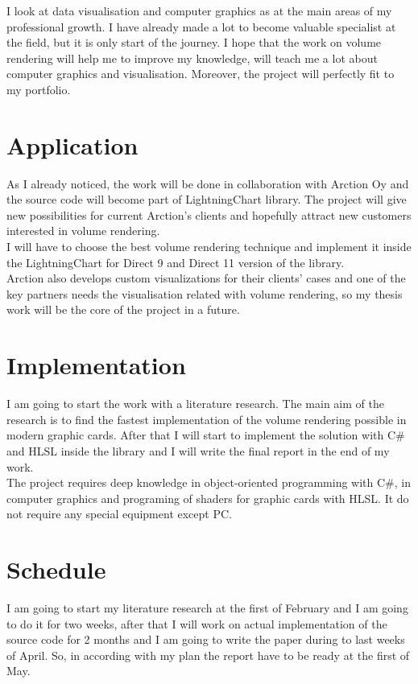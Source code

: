 \documentclass[english]{article}
\begin{document}
I look at data visualisation and computer graphics as at the main areas of my professional growth. I have already made a lot to become valuable specialist at the field, but it is only start of the journey. I hope that the work on volume rendering will help me to improve my knowledge, will teach me a lot about computer graphics and visualisation. Moreover, the project will perfectly fit to my portfolio.

\section{Application}

As I already noticed, the work will be done in collaboration with Arction Oy and the source code will become part of LightningChart library. The project will give new possibilities for current Arction's clients and hopefully attract new customers interested in volume rendering.\\

I will have to choose the best volume rendering technique and implement it inside the LightningChart for Direct 9 and Direct 11 version of the library.\\

Arction also develops custom visualizations for their clients' cases and one of the key partners needs the visualisation related with volume rendering, so my thesis work will be the core of the project in a future.

\section{Implementation}

I am going to start the work with a literature research. The main aim of the research is to find the fastest implementation of the volume rendering possible in modern graphic cards. After that I will start to implement the solution with C\# and HLSL inside the library and I will write the final report in the end of my work.\\ 

The project requires deep knowledge in object-oriented programming with C\#, in computer graphics and programing of shaders for graphic cards with HLSL. It do not require any special equipment except PC.

\section{Schedule}

I am going to start my literature research at the first of February and I am going to do it for two weeks, after that I will work on actual implementation of the source code for 2 months and I am going to write the paper during to last weeks of April. So, in according with my plan the report have to be ready at the first of May.
\end{document}
